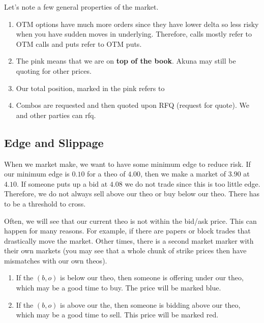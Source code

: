\documentclass{article}
\begin{document}
    Let's note a few general properties of the market. 
    \begin{enumerate}
      \item OTM options have much more orders since they have lower delta so less risky when you have sudden moves in underlying. Therefore, calls mostly refer to OTM calls and puts refer to OTM puts. 

      \item The pink means that we are on \textbf{top of the book}. Akuna may still be quoting for other prices.

      \item Our total position, marked in the pink refers to 
      \item Combos are requested and then quoted upon RFQ (request for quote). We and other parties can rfq. 
    \end{enumerate}

  \subsection{Edge and Slippage}
  
    When we market make, we want to have some minimum edge to reduce risk. If our minimum edge is $0.10$ for a theo of $4.00$, then we make a market of $3.90$ at $4.10$. If someone puts up a bid at $4.08$ we do not trade since this is too little edge. Therefore, we do not always sell above our theo or buy below our theo. There has to be a threshold to cross. 

    Often, we will see that our current theo is not within the bid/ask price. This can happen for many reasons. For example, if there are papers or block trades that drastically move the market. Other times, there is a second market marker with their own markets (you may see that a whole chunk of strike prices then have mismatches with our own theos). 
    \begin{enumerate}
      \item If the $(b, o)$ is below our theo, then someone is offering under our theo, which may be a good time to buy. The price will be marked blue. 
      \item If the $(b, o)$ is above our the, then someone is bidding above our theo, which may be a good time to sell. This price will be marked red. 
    \end{enumerate}
\end{document}
